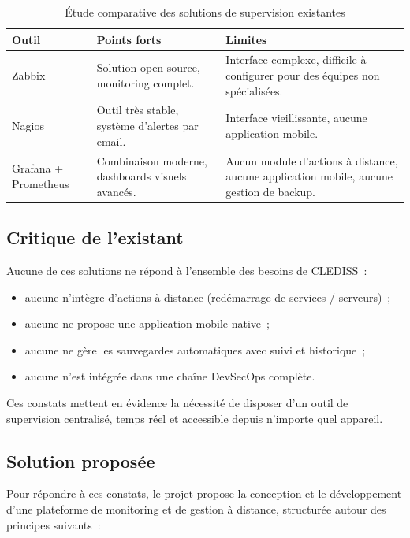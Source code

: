 \begin{table}[H]
\centering
\caption{Étude comparative des solutions de supervision existantes}
\label{tab-etude-existant}
\small
\begin{tabularx}{\linewidth}{@{}lXX@{}}
\toprule
\textbf{Outil} & \textbf{Points forts} & \textbf{Limites} \\
\midrule
Zabbix & Solution open source, monitoring complet. & Interface complexe, difficile à configurer pour des équipes non spécialisées. \\
Nagios & Outil très stable, système d'alertes par email. & Interface vieillissante, aucune application mobile. \\
Grafana + Prometheus & Combinaison moderne, dashboards visuels avancés. & Aucun module d'actions à distance, aucune application mobile, aucune gestion de backup. \\
\bottomrule
\end{tabularx}
\end{table}

\subsection{Critique de l'existant}

Aucune de ces solutions ne répond à l'ensemble des besoins de CLEDISS~:

\begin{itemize}
  \item aucune n'intègre d'actions à distance (redémarrage de services / serveurs)~;
  \item aucune ne propose une application mobile native~;
  \item aucune ne gère les sauvegardes automatiques avec suivi et historique~;
  \item aucune n'est intégrée dans une chaîne DevSecOps complète.
\end{itemize}

Ces constats mettent en évidence la nécessité de disposer d'un outil de supervision centralisé, temps réel et accessible depuis n'importe quel appareil.

\subsection{Solution proposée}

Pour répondre à ces constats, le projet propose la conception et le développement d'une plateforme de monitoring et de gestion à distance, structurée autour des principes suivants~:

